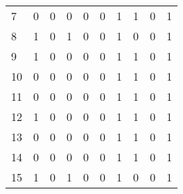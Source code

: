 \begin{longtable}{lrrrrrrrrr}
7     &                          0 &                             0 &                          0 &                        0 &                           0 &                        1 &                         1 &                            0 &                         1 \\
8     &                          1 &                             0 &                          1 &                        0 &                           0 &                        1 &                         0 &                            0 &                         1 \\
9     &                          1 &                             0 &                          0 &                        0 &                           0 &                        1 &                         1 &                            0 &                         1 \\
10    &                          0 &                             0 &                          0 &                        0 &                           0 &                        1 &                         1 &                            0 &                         1 \\
11    &                          0 &                             0 &                          0 &                        0 &                           0 &                        1 &                         1 &                            0 &                         1 \\
12    &                          1 &                             0 &                          0 &                        0 &                           0 &                        1 &                         1 &                            0 &                         1 \\
13    &                          0 &                             0 &                          0 &                        0 &                           0 &                        1 &                         1 &                            0 &                         1 \\
14    &                          0 &                             0 &                          0 &                        0 &                           0 &                        1 &                         1 &                            0 &                         1 \\
15    &                          1 &                             0 &                          1 &                        0 &                           0 &                        1 &                         0 &                            0 &                         1 \\

\end{longtable}
